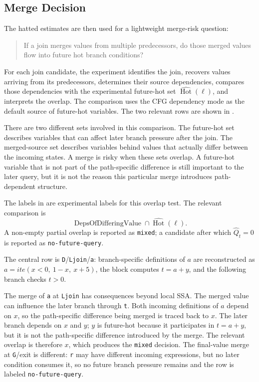 \documentclass[conference]{IEEEtran}
\newcommand{\ite}{\mathit{ite}}
\begin{document}
\subsection{Merge Decision}
\label{sec:qce-merge-decision}

The hatted estimates are then used for a lightweight merge-risk question:

\begin{quote}
If a join merges values from multiple predecessors, do those merged values flow
into future hot branch conditions?
\end{quote}

For each join candidate, the experiment identifies the join, recovers values
arriving from its predecessors, determines their source dependencies, compares
those dependencies with the experimental future-hot set
\(\widehat{\operatorname{Hot}}(\ell)\), and interprets the overlap. The
comparison uses the CFG dependency mode as the default source of future-hot
variables. The two relevant rows are shown in
.

There are two different sets involved in this comparison. The future-hot set
describes variables that can affect later branch pressure after the join. The
merged-source set describes variables behind values that actually differ
between the incoming states. A merge is risky when these sets overlap. A
future-hot variable that is not part of the path-specific difference is still
important to the later query, but it is not the reason this particular merge
introduces path-dependent structure.

The labels in  are experimental labels for this
overlap test. The relevant comparison is
\[
\operatorname{DepsOfDifferingValue}
\cap
\widehat{\operatorname{Hot}}(\ell).
\]
A non-empty partial overlap is reported as \texttt{mixed}; a candidate after
which \(\widehat{Q}_t=0\) is reported as \texttt{no-future-query}.

The central row is \texttt{D}/\texttt{Ljoin}/\texttt{a}: branch-specific
definitions of \(a\) are reconstructed as
\(a=\ite(x<0,\ 1-x,\ x+5)\), the block computes \(t=a+y\), and the following
branch checks \(t>0\).

The merge of \texttt{a} at \texttt{Ljoin} has consequences beyond local SSA. The
merged value can influence the later branch through \texttt{t}. Both incoming
definitions of \(a\) depend on \(x\), so the path-specific difference being
merged is traced back to \(x\). The later branch depends on \(x\) and \(y\);
\(y\) is future-hot because it participates in \(t=a+y\), but it is not the
path-specific difference introduced by the merge. The relevant overlap is
therefore \(x\), which produces the \texttt{mixed} decision. The final-value
merge at \texttt{G}/exit is different: \texttt{r} may have different incoming
expressions, but no later condition consumes it, so no future branch pressure
remains and the row is labeled \texttt{no-future-query}.
\end{document}
